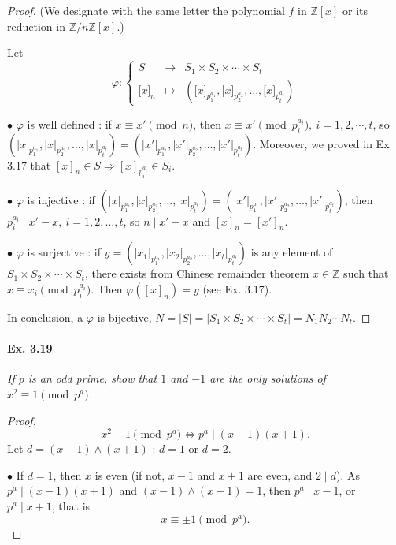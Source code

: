 \documentclass[11pt,a4paper]{article}
\newcommand{\Z}{\mathbb{Z}}
\begin{document}
{\begin{proof}
(We designate with the same letter the polynomial $f$ in $\Z[x]$ or its reduction in $\Z/n\Z[x]$.)

Let
$$\varphi :
\left\{
\begin{array}{ccc}
  S&  \to  & S_1\times S_2\times \cdots\times S_t  \\
  {[}x{]}_n& \mapsto   & ({[}x{]}_{p_1^{a_1}}, {[}x{]}_{p_2^{a_2}},\ldots, {[}x{]}_{p_t^{a_t}})    
\end{array}
\right.
$$

$\bullet$ $\varphi$ is well defined : if $x \equiv x' \pmod n$, then $x \equiv x' \pmod {p_i^{a_i}},\ i=1,2,\cdots,t$, so $({[}x{]}_{p_1^{a_1}}, {[}x{]}_{p_2^{a_2}},\ldots, {[}x{]}_{p_t^{a_t}}) =({[}x'{]}_{p_1^{a_1}}, {[}x'{]}_{p_2^{a_2}},\ldots, {[}x'{]}_{p_t^{a_t}})$.  Moreover, we proved in Ex 3.17 that $[x]_n \in S \Rightarrow [x]_{p_i^{a_i}} \in S_i$.

$\bullet$ $\varphi$ is injective : if $({[}x{]}_{p_1^{a_1}}, {[}x{]}_{p_2^{a_2}},\ldots, {[}x{]}_{p_t^{a_t}}) =({[}x'{]}_{p_1^{a_1}}, {[}x'{]}_{p_2^{a_2}},\ldots, {[}x'{]}_{p_t^{a_t}})$, then $p_i^{a_i} \mid x'-x,\ i=1,2,\ldots,t$, so $n \mid x'-x$ and $[x]_n = [x']_n$.

$\bullet$ $\varphi$ is surjective : if $y=({[}x_1{]}_{p_1^{a_1}}, {[}x_2{]}_{p_2^{a_2}},\ldots, {[}x_t{]}_{p_t^{a_t}})$ is any element of $S_1\times S_2\times \cdots\times S_t$, there exists from Chinese remainder theorem $x \in \Z$ such that $x\equiv x_i \pmod {p_i^{a_i}}$. Then $\varphi([x]_n) = y$ (see Ex. 3.17).

In conclusion, a $\varphi$ is bijective,  $N = \vert S \vert = \vert S_1\times S_2\times \cdots\times S_t \vert= N_1N_2\cdots N_t$.
\end{proof}

\paragraph{Ex. 3.19}

{\it If $p$ is an odd prime, show that $1$ and $-1$ are the only solutions of $x^2 \equiv 1 \pmod {p^a}$.
}

\begin{proof}
$$x^2-1\pmod{p^a} \iff p^a \mid (x-1)(x+1).$$
Let $d = (x-1)\wedge(x+1)$ : $d = 1$ or $d=2$.

$\bullet$ If $d=1$, then $x$ is even (if not, $x-1$ and $x+1$ are even, and $2\mid d$).
As $p^a \mid (x-1)(x+1)$ and $(x-1) \wedge (x+1) = 1$, then $p^a \mid  x-1$, or $p^a \mid x +1$, that is $$x\equiv \pm 1 \pmod {p^a}.$$


\end{proof}}
\end{document}
